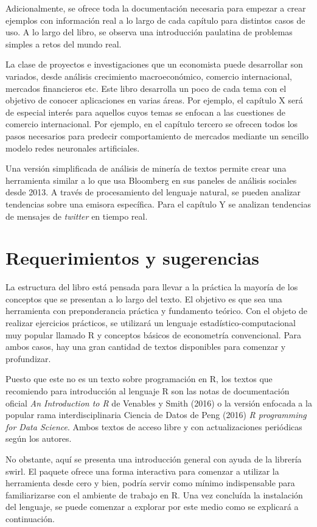 \documentclass[letterpaper,12pt, spanish, oneside]{book} %
\begin{document}
Adicionalmente, se ofrece toda la documentación necesaria para empezar a crear ejemplos con información real a lo largo de cada capítulo para distintos casos de uso. A lo largo del libro, se observa una introducción paulatina de problemas simples a retos del mundo real. 

La clase de proyectos e investigaciones que un economista puede desarrollar son variados, desde análisis crecimiento macroeconómico, comercio internacional, mercados financieros etc. Este libro desarrolla un poco de cada tema con el objetivo de conocer aplicaciones en varias áreas. Por ejemplo, el capítulo X será de especial interés para aquellos cuyos temas se enfocan a las cuestiones de comercio internacional. Por ejemplo, en el capítulo tercero se ofrecen todos los pasos necesarios para predecir comportamiento de mercados mediante un sencillo modelo redes neuronales artificiales.

Una versión simplificada de análisis de minería de textos permite crear una herramienta similar a lo que usa Bloomberg en sus paneles de análisis sociales desde 2013. A través de procesamiento del lenguaje natural, se pueden analizar tendencias sobre una emisora específica. Para el capítulo Y se analizan tendencias de mensajes de \textit{twitter} en tiempo real.


\chapter{Requerimientos y sugerencias}

La estructura del libro está pensada para llevar a la práctica la mayoría de los conceptos que se presentan a lo largo del texto. El objetivo es que sea una herramienta con preponderancia práctica y fundamento teórico. Con el objeto de realizar ejercicios prácticos, se utilizará un lenguaje estadístico-computacional muy popular llamado R y conceptos básicos de econometría convencional. Para ambos casos, hay una gran cantidad de textos disponibles para comenzar y profundizar. 

Puesto que este no es un texto sobre programación en R,  los textos que recomiendo para introducción al lenguaje R son las notas de documentación oficial \textit{An Introduction to R} de Venables y Smith (2016) o la versión enfocada a la popular rama interdisciplinaria Ciencia de Datos de Peng (2016) \textit{R programming for Data Science}. Ambos textos de acceso libre y con actualizaciones periódicas según los autores. 

No obstante, aquí se presenta una introducción general con ayuda de la librería swirl.  El paquete ofrece una forma interactiva para comenzar a utilizar la herramienta desde cero y bien, podría servir como mínimo indispensable para familiarizarse con el ambiente de trabajo en R. Una vez concluída la instalación del lenguaje, se puede comenzar a explorar por este medio como se explicará a continuación. 
\end{document}
